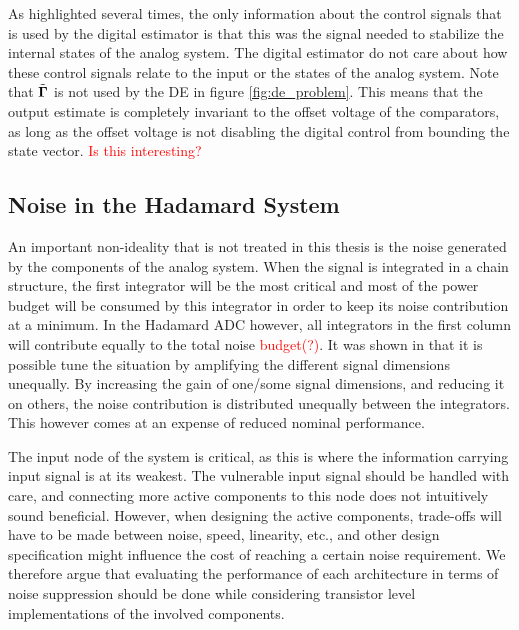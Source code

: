 As highlighted several times, the only information about the control signals that is used by the digital estimator is that this was the signal needed to stabilize the internal states of the analog system. The digital estimator do not care about how these control signals relate to the input or the states of the analog system. Note that $\tilde{\bm{\Gamma}}$ is not used by the DE in figure \ref{fig:de_problem}. This means that the output estimate is completely invariant to the offset voltage of the comparators, as long as the offset voltage is not disabling the digital control from bounding the state vector.
\textcolor{red}{Is this interesting?}





\subsection{Noise in the Hadamard System}
An important non-ideality that is not treated in this thesis is the noise generated by the components of the analog system. When the signal is integrated in a chain structure, the first integrator will be the most critical and most of the power budget will be consumed by this integrator in order to keep its noise contribution at a minimum. In the Hadamard ADC however, all integrators in the first column will contribute equally to the total noise \textcolor{red}{budget(?)}. It was shown in \cite{malmberg_thesis} that it is possible tune the situation by amplifying the different signal dimensions unequally. By increasing the gain of one/some signal dimensions, and reducing it on others, the noise contribution is distributed unequally between the integrators. This however comes at an expense of reduced nominal performance.

The input node of the system is critical, as this is where the information carrying input signal is at its weakest. The vulnerable input signal should be handled with care, and connecting more active components to this node does not intuitively sound beneficial. However, when designing the active components, trade-offs will have to be made between noise, speed, linearity, etc., and other design specification might influence the cost of reaching a certain noise requirement. We therefore argue that evaluating the performance of each architecture in terms of noise suppression should be done while considering transistor level implementations of the involved components.














